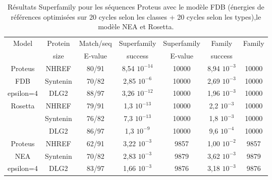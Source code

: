 \begin{table}[h]
  \raggedleft{}
  
  \begin{tabular}{ccccccc}
    
    \toprule
    Model &Protein & Match/seq & Superfamily & Superfamily & Family & Family \\
            & size      & E-value      & success     & E-value & success\\
    \cmidrule{1-7}
    Proteus                   & NHREF     & 80/91  &  8,54 $10^{-14}$  & 10000  & 8,94 $10^{-3}$ & 10000 \\
    FDB                       & Syntenin  & 70/82  &  2,85 $10^{-6}$   & 10000  & 2,69 $10^{-3}$ & 10000 \\
    epsilon=4                 & DLG2      & 88/97  &  3,26 $10^{-12}$  & 10000  & 1,96 $10^{-3}$ & 10000 \\
    \cmidrule{1-7}
    \multirow{3}{*}{Rosetta}  & NHREF     & 79/91  &  1,3 $10^{-13}$ & 10000    & 2,2 $10^{-3}$ & 10000 \\
                              & Syntenin  & 76/82  &  7,3 $10^{-13}$ & 10000    & 1,8 $10^{-3}$ & 10000 \\
                              & DLG2      & 86/97  &  1,3 $10^{-9}$  & 10000    & 9,6 $10^{-4}$ & 10000 \\    
    \cmidrule{1-7}
    Proteus                   & NHREF     & 62/91 &   3,22 $10^{-3}$  & 9857    & 1,00 $10^{-2}$ & 9857 \\
    NEA                       & Syntenin  & 70/82 &   2,83 $10^{-3}$  & 9879    & 3,62 $10^{-3}$ & 9879 \\
    epsilon=4                 & DLG2      & 83/97 &   1,66 $10^{-3}$  & 9876    & 3,18 $10^{-3}$ & 9876 \\ 
    \bottomrule        
  \end{tabular}   
  \caption{Résultats Superfamily pour les séquences Proteus avec le modèle FDB (énergies de références optimisées sur 20 cycles selon les classes + 20 cycles selon les types),le modèle NEA et Rosetta.}   
  \label{tab:superfamily3prot}       
\end{table}

